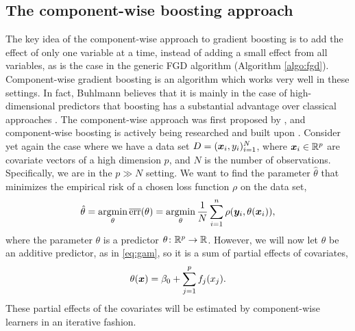 \subsection{The component-wise boosting approach}
\label{subsec:comp-wise approach}
The key idea of the component-wise approach to gradient boosting is to add the effect of only one variable at a time, instead of adding a small effect from all variables, as is the case in the generic FGD algorithm (Algorithm \ref{algo:fgd}).
Component-wise gradient boosting is an algorithm which works very well in these settings.
In fact, Buhlmann believes that it is mainly in the case of high-dimensional predictors that boosting has a substantial advantage over classical approaches \citep{buhlmann2006}.
The component-wise approach was first proposed by \citet{buhlmann-yu}, and component-wise boosting is actively being researched and built upon \citep{buhlmann2006, mayr14a, mayr14b, mayr17, thomas2018}.
Consider yet again the case where we have a data set $D=(\bm{x}_i,y_i)_{i=1}^N$, where $\bm{x}_i\in\mathbb{R}^p$ are covariate vectors of a high dimension $p$, and $N$ is the number of observations.
Specifically, we are in the $p\gg N$ setting.
We want to find the parameter $\hat{\theta}$ that minimizes the empirical risk of a chosen loss function $\rho$ on the data set,
\begin{equation*}
    \hat{\theta}=\operatorname*{argmin}_{\theta}\overline{\text{err}}(\theta)=\operatorname*{argmin}_{\theta}\frac{1}{N}\sum_{i=1}^n\rho(\bm{y}_i,\theta(\bm{x}_i)),
\end{equation*}
where the parameter $\theta$ is a predictor $\theta\colon\mathbb{R}^p\to\mathbb{R}$.
However, we will now let $\theta$ be an additive predictor, as in \eqref{eq:gam}, so it is a sum of partial effects of covariates,
\begin{equation*}
    \theta(\bm{x})=\beta_0+\sum_{j=1}^p f_j(x_j).
\end{equation*}
These partial effects of the covariates will be estimated by component-wise learners in an iterative fashion.


